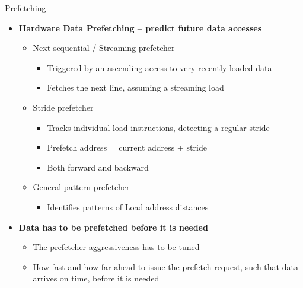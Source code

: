 \documentclass[aspectratio=169,12pt]{beamer}
\begin{document}
\begin{frame}{Prefetching}
\begin{itemize}
  \item \textbf{Hardware Data Prefetching -- predict future data accesses}
  \begin{itemize}
    \item Next sequential / Streaming prefetcher
    \begin{itemize}
      \item Triggered by an ascending access to very recently loaded data
      \item Fetches the next line, assuming a streaming load
    \end{itemize}
    \item Stride prefetcher
    \begin{itemize}
      \item Tracks individual load instructions, detecting a regular stride
      \item Prefetch address = current address + stride
      \item Both forward and backward
    \end{itemize}
    \item General pattern prefetcher
    \begin{itemize}
      \item Identifies patterns of Load address distances
    \end{itemize}
  \end{itemize}
  
  \item \textbf{Data has to be prefetched before it is needed}
  \begin{itemize}
    \item The prefetcher aggressiveness has to be tuned
    \item How fast and how far ahead to issue the prefetch request, such that data arrives on time, before it is needed
  \end{itemize}
\end{itemize}
\end{frame}
\end{document}
